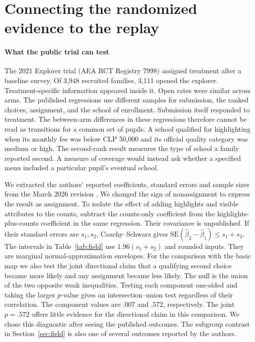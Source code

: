 \section{Connecting the randomized evidence to the replay}\label{sec:field-audit}
\paragraph{What the public trial can test}
The 2021 Explorer trial (AEA RCT Registry 7998) assigned treatment after a baseline survey. Of 3,948 recruited families, 3,111 opened the explorer. Treatment-specific information appeared inside it. Open rates were similar across arms. The published regressions use different samples for submission, the ranked choices, assignment, and the school of enrollment. Submission itself responded to treatment. The between-arm differences in these regressions therefore cannot be read as transitions for a common set of pupils. A school qualified for highlighting when its monthly fee was below CLP 50,000 and its official quality category was medium or high. The second-rank result measures the type of school a family reported second. A measure of coverage would instead ask whether a specified menu included a particular pupil's eventual school.

We extracted the authors' reported coefficients, standard errors and sample sizes from the March 2026 revision \citep{schoolSearch}. We changed the sign of nonassignment to express the result as assignment. To isolate the effect of adding highlights and visible attributes to the counts, subtract the counts-only coefficient from the highlights-plus-counts coefficient in the same regression. Their covariance is unpublished. If their standard errors are $s_1,s_2$, Cauchy--Schwarz gives $\mathrm{SE}(\hat\beta_2-\hat\beta_1)\leq s_1+s_2$. The intervals in Table~\ref{tab:field} use $1.96(s_1+s_2)$ and rounded inputs. They are marginal normal-approximation envelopes. For the comparison with the basic map we also test the joint directional claim that a qualifying second choice became more likely and any assignment became less likely. The null is the union of the two opposite weak inequalities. Testing each component one-sided and taking the larger $p$-value gives an intersection--union test regardless of their correlation. The component values are .007 and .572, respectively. The joint $p=.572$ offers little evidence for the directional claim in this comparison. We chose this diagnostic after seeing the published outcomes. The subgroup contrast in Section~\ref{sec:field} is also one of several outcomes reported by the authors.

